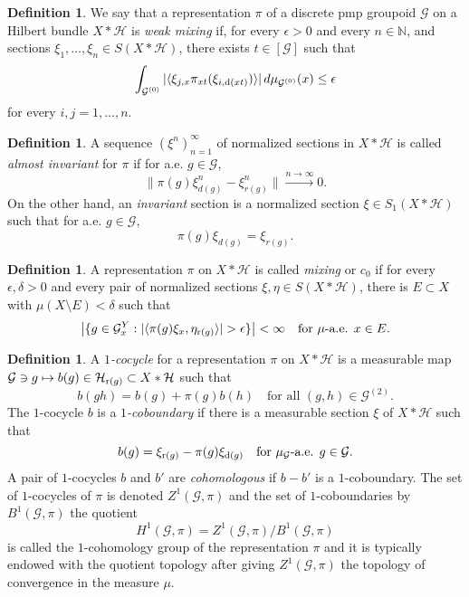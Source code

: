 \documentclass[a4paper,11pt]{article}
\numberwithin{equation}{section}
\theoremstyle{definition}
\newtheorem{defn}[thm]{Definition}
\theoremstyle{remark}
\numberwithin{equation}{section}
\newcommand{\rG}{\mathcal{G}}
\def\N{\mathbb{N}}
\def\H{\mathcal H}
\def\r{{\rm r}}
\def\d{{\rm d}}
\def\<{\langle}
\def\>{\rangle}
\providecommand{\norm}[1]{\lVert#1\rVert}
\numberwithin{equation}{section}
\begin{document}
\begin{defn}\label{weakmixing}
  We say that a representation $\pi$ of a discrete pmp groupoid $\rG$ on a Hilbert bundle $X\ast \H$ is  \textit{weak mixing} if, for every $\epsilon >0$ and every $n\in \N$, and sections $ \xi_{1},\ldots, \xi_{n}\in S(X\ast\H) $, there exists $ t\in [\rG] $ such that
\[
  \int_{\rG^{(0)}} |\langle{\xi_{j,x}}{\pi_{xt}(\xi_{i,\d(xt)})}\rangle| \dd{\mu_{\rG^{(0)}}(x)} \leq \epsilon
\]
for every $ i,j = 1,\ldots, n $.
\end{defn}


\begin{defn}\label{invsect}
   A sequence $ (\xi^{n})_{n=1}^{\infty}$ of normalized sections in $ X\ast\H $ is called \textit{almost invariant} for $ \pi $ if for a.e. $ g\in \rG $,
   \[
     \norm{\pi(g) \xi_{d(g)}^{n}- \xi_{r(g)}^{n}} \xrightarrow{n\to\infty}0.
   \] On the other hand, an \textit{invariant} section is a normalized section $\xi\in S_1(X\ast\H)$ such that for a.e. $ g\in \rG $,
   \[
     \pi(g) \xi_{d(g)}= \xi_{r(g)}.
   \]
\end{defn}




\begin{defn}
    A representation $\pi$ on $X \ast \H$ is called {\it mixing} or $c_0$ if 
for every $\epsilon, \delta > 0$ and every pair of normalized sections $\xi, \eta \in S(X \ast \H)$, there is $E \subset X$ with $\mu(X \setminus E) < \delta$ such that 
$$
\left|\{g \in \rG_x^Y : |\<\pi(g)\xi_x, \eta_{\r(g)}\>| > \epsilon\}\right| < \infty  \quad \text{for $\mu$-a.e. $x \in E$.}
$$
\end{defn}


\begin{defn}\label{cohom}
    A {\it $1$-cocycle} for a representation $\pi$ on $X \ast \H$ is a measurable map $\rG\ni g \mapsto b(g) \in \H_{\r(g)}\subset X\ast \H$ such that 
\begin{equation}\label{cocycle} 
b(gh) = b(g) + \pi(g)b(h) \quad \text{for all } (g,h)\in \rG^{(2)}.
\end{equation} The $1$-cocycle $b$ is a {\it $1$-coboundary} if there is a measurable section $\xi$ of $X \ast \H$ such that 
\begin{equation}\label{cobound} 
b(g) = \xi_{\r(g)} - \pi(g)\xi_{\d(g)} \quad \textup{for  $\mu_\rG$-a.e. $g\in\rG$}.
\end{equation}
A pair of $1$-cocycles $b$ and $b'$ are {\it cohomologous} if $b - b'$ is a $1$-coboundary. The set of $1$-cocycles of $\pi$ is denoted $Z^1(\rG,\pi)$ and the set of $1$-coboundaries by $B^1(\rG,\pi)$ the quotient 
$$
H^1(\rG,\pi)=Z^1(\rG,\pi)/B^1(\rG,\pi)
$$ is called the $1$-cohomology group of the representation $\pi$ and it is typically endowed with the quotient topology after giving $Z^1(\rG,\pi)$ the topology of convergence in the measure $\mu$.
\end{defn}
\end{document}

